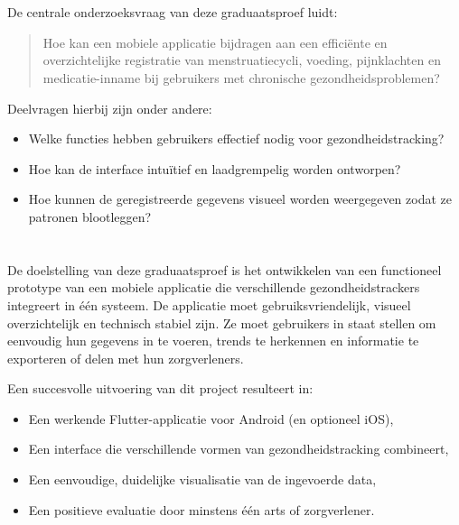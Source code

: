 \section{}%
\label{sec:onderzoeksvraag}

De centrale onderzoeksvraag van deze graduaatsproef luidt:

\begin{quote}
    Hoe kan een mobiele applicatie bijdragen aan een efficiënte en overzichtelijke registratie van menstruatiecycli, voeding, pijnklachten en medicatie-inname bij gebruikers met chronische gezondheidsproblemen?
\end{quote}

Deelvragen hierbij zijn onder andere: 
\begin{itemize}
    \item Welke functies hebben gebruikers effectief nodig voor gezondheidstracking?
    \item Hoe kan de interface intuïtief en laadgrempelig worden ontworpen?
    \item Hoe kunnen de geregistreerde gegevens visueel worden weergegeven zodat ze patronen blootleggen?
\end{itemize}

\section{}%
\label{sec:onderzoeksdoelstelling}
De doelstelling van deze graduaatsproef is het ontwikkelen van een functioneel prototype van een mobiele applicatie die verschillende gezondheidstrackers integreert in één systeem. 
De applicatie moet gebruiksvriendelijk, visueel overzichtelijk en technisch stabiel zijn. Ze moet gebruikers in staat stellen om eenvoudig hun gegevens in te voeren, trends te herkennen en informatie te exporteren of delen met hun zorgverleners.

Een succesvolle uitvoering van dit project resulteert in: 
\begin{itemize}
    \item Een werkende Flutter-applicatie voor Android (en optioneel iOS),
    \item Een interface die verschillende vormen van gezondheidstracking combineert,
    \item Een eenvoudige, duidelijke visualisatie van de ingevoerde data,
    \item Een positieve evaluatie door minstens één arts of zorgverlener. 
\end{itemize}

